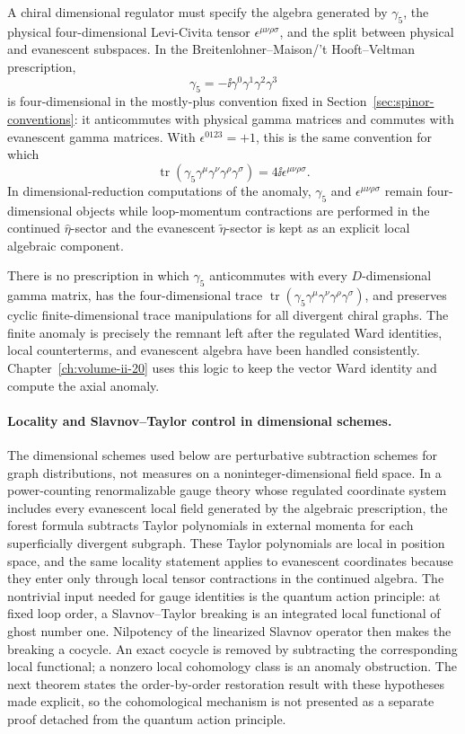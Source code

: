 \begin{definition}
A chiral dimensional regulator must specify the algebra generated by
\(\gamma_5\), the physical four-dimensional Levi-Civita tensor
\(\epsilon^{\mu\nu\rho\sigma}\), and the split between physical and evanescent
subspaces.  In the Breitenlohner--Maison/'t Hooft--Veltman prescription,
\[
  \gamma_5=-\ii\gamma^0\gamma^1\gamma^2\gamma^3
\]
is four-dimensional in the mostly-plus convention fixed in
Section~\ref{sec:spinor-conventions}: it anticommutes with physical gamma
matrices and commutes with evanescent gamma matrices.  With
\(\epsilon^{0123}=+1\), this is the same convention for which
\[
  \operatorname{tr}
  \left(\gamma_5\gamma^\mu\gamma^\nu\gamma^\rho\gamma^\sigma\right)
  =
  4\ii\epsilon^{\mu\nu\rho\sigma}.
\]
In dimensional-reduction computations of the anomaly, \(\gamma_5\) and
\(\epsilon^{\mu\nu\rho\sigma}\) remain four-dimensional objects while
loop-momentum contractions are performed in the continued \(\hat\eta\)-sector
and the evanescent \(\tilde\eta\)-sector is kept as an explicit local algebraic
component.
\end{definition}

There is no prescription in which \(\gamma_5\) anticommutes with every
\(D\)-dimensional gamma matrix, has the four-dimensional trace
\(\operatorname{tr}(\gamma_5\gamma^\mu\gamma^\nu\gamma^\rho\gamma^\sigma)\),
and preserves cyclic finite-dimensional trace manipulations for all divergent
chiral graphs.  The finite anomaly is precisely the remnant left after the
regulated Ward identities, local counterterms, and evanescent algebra have
been handled consistently.  Chapter~\ref{ch:volume-ii-20} uses this
logic to keep the vector Ward identity and compute the axial anomaly.

\paragraph{Locality and Slavnov--Taylor control in dimensional schemes.}
The dimensional schemes used below are perturbative subtraction schemes for
graph distributions, not measures on a noninteger-dimensional field space.  In
a power-counting renormalizable gauge theory whose regulated coordinate system
includes every evanescent local field generated by the algebraic prescription,
the forest formula subtracts Taylor polynomials in external momenta for each
superficially divergent subgraph.  These Taylor polynomials are local in
position space, and the same locality statement applies to evanescent
coordinates because they enter only through local tensor contractions in the
continued algebra.  The nontrivial input needed for gauge identities is the
quantum action principle: at fixed loop order, a Slavnov--Taylor breaking is an
integrated local functional of ghost number one.  Nilpotency of the linearized
Slavnov operator then makes the breaking a cocycle.  An exact cocycle is
removed by subtracting the corresponding local functional; a nonzero local
cohomology class is an anomaly obstruction.  The next theorem states the
order-by-order restoration result with these hypotheses made explicit, so the
cohomological mechanism is not presented as a separate proof detached from the
quantum action principle.

